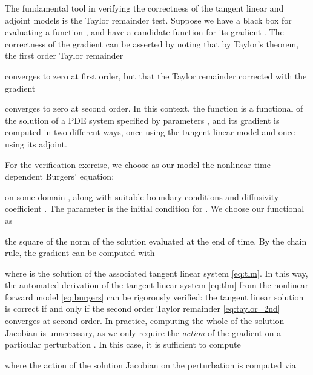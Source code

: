 \documentclass{siamltex}
\begin{document}
The fundamental tool in verifying the correctness of the tangent linear and adjoint
models is the Taylor remainder test. Suppose we have a black box for evaluating a function ,
and have a candidate function for its gradient . The correctness of the gradient can
be asserted by noting that by Taylor's theorem, the first order Taylor remainder

converges to zero at first order, but that the Taylor remainder corrected with the gradient

converges to zero at second order. In this context, the function  is a functional of the solution 
of a PDE system  specified by parameters , and its gradient  is computed in two different ways, once using the tangent linear model
and once using its adjoint.

For the verification exercise, we choose as our model the nonlinear time-dependent Burgers'
equation:

on some domain , along with suitable boundary conditions and diffusivity coefficient . The parameter  is the initial condition
for . We choose our functional  as

the square of the  norm of the solution evaluated at the end of time. By the chain rule, the gradient
 can be computed with

where  is the solution of the associated tangent linear system \eqref{eq:tlm}.
In this way, the automated derivation of the tangent linear system \eqref{eq:tlm} from the nonlinear
forward model \eqref{eq:burgers} can be rigorously verified: the tangent linear solution is correct
if and only if the second order Taylor remainder \eqref{eq:taylor_2nd} converges at second order.
In practice, computing the whole of the solution Jacobian  is unnecessary, as we only require
the \emph{action} of the gradient  on a particular perturbation . In this case,
it is sufficient to compute

where the action of the solution Jacobian  on the perturbation  is computed via
\end{document}
